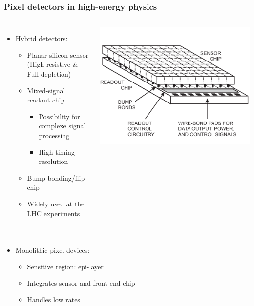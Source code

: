 \begin{frame}
  \frametitle{Pixel detectors in high-energy physics}

  \begin{columns}
    \begin{itemize}
    \item Hybrid detectors:
      \begin{itemize}
      \item Planar silicon sensor (High resistive \& Full depletion)
      \item Mixed-signal readout chip
        \begin{itemize}
        \item Possibility for complexe signal processing
        \item High timing resolution
        \end{itemize}
      \item Bump-bonding/flip chip
      \item Widely used at the LHC experiments
      \end{itemize}
    \end{itemize}

    \centering
    \includegraphics[width=\textwidth]{figures/hybridDet.pdf}
  \end{columns}

  \begin{columns}
    \begin{itemize}
    \item Monolithic pixel devices:
      \begin{itemize}
      \item Sensitive region: epi-layer
      \item Integrates sensor and front-end chip
      \item Handles low rates
      \end{itemize}
    \end{itemize}


\end{columns}
\end{frame}
